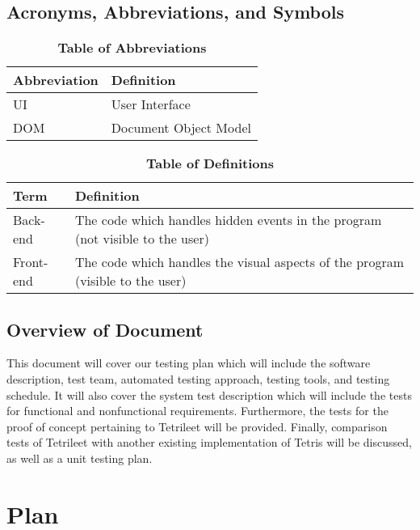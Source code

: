 \documentclass[12pt, titlepage]{article}
\begin{document}
\subsection{Acronyms, Abbreviations, and Symbols}
	
\begin{table}[hbp]
\caption{\textbf{Table of Abbreviations}} \label{Table}

\begin{tabularx}{\textwidth}{p{3cm}X}
\toprule
\textbf{Abbreviation} & \textbf{Definition} \\
\midrule
UI & User Interface\\
DOM & Document Object Model \\
\bottomrule
\end{tabularx}

\end{table}


\begin{table}[!htbp]
\caption{\textbf{Table of Definitions}} \label{Table}

\begin{tabularx}{\textwidth}{p{3cm}X}
\toprule
\textbf{Term} & \textbf{Definition}\\
\midrule
Back-end & The code which handles hidden events in the program (not visible to the user)\\
Front-end & The code which handles the visual aspects of the program (visible to the user)\\
\bottomrule
\end{tabularx}

\end{table}	

\subsection{Overview of Document}
This document will cover our testing plan which will include the software description, test team, automated testing approach, testing tools, and testing schedule. It will also cover the system test description which will include the tests for functional and nonfunctional requirements. Furthermore, the tests for the proof of concept pertaining to Tetrileet will be provided. Finally, comparison tests of Tetrileet with another existing implementation of Tetris will be discussed, as well as a unit testing plan.   
\section{Plan}
	
\end{document}
